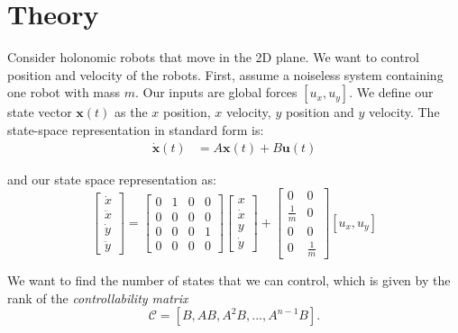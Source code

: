 \section{Theory}
\label{sec:theory}


Consider holonomic robots that move in the 2D plane. We want to control position and velocity of the robots. 
First, assume a noiseless system containing one robot with mass $m$.
 Our inputs are global forces $[u_x,u_y]$. We define our state vector $\mathbf{x}(t)$ as the $x$ position, $x$ velocity, $y$ position and $y$ velocity.
The state-space representation in standard form is: 
\begin{align}\label{eq:stdform}
\dot{\mathbf{x}}(t)  &=  A \mathbf{x}(t) + B \mathbf{u}(t)
\end{align}

and our state space representation as:
\begin{equation}
\begin{bmatrix}
\dot{x}\\ 
\ddot{x}\\
\dot{y}\\
\ddot{y}
\end{bmatrix} = \begin{bmatrix}
0 & 1 & 0 & 0 \\
0 & 0 & 0 & 0\\
0 & 0 & 0 & 1\\
0 & 0 & 0 & 0
\end{bmatrix}  \begin{bmatrix}
x\\
\dot{x}\\
y\\
\dot{y}
\end{bmatrix} + \begin{bmatrix}
0 & 0 \\
\frac{1}{m} & 0 \\
0 & 0 \\
0 & \frac{1}{m}
\end{bmatrix}  [u_x,u_y]
\end{equation}

We want to find the number of states that we can control, which is given by the rank of the \emph{controllability matrix}
\begin{equation}
\mathcal{C} = [ B, AB, A^2B, ... , A^{n-1}B ].
\end{equation}

